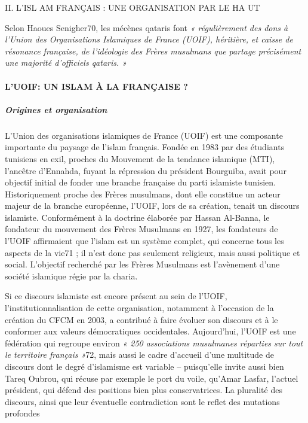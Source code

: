 II. L'ISL AM FRANÇAIS : UNE ORGANISATION PAR LE HA UT

Selon Haoues Senigher70, les mécènes qataris font \emph{« régulièrement
des dons à l'Union des Organisations Islamiques de France (UOIF),
héritière, et caisse de résonance française, de l'idéologie des Frères
musulmans que partage précisément une majorité d'officiels qataris. »}


\hypertarget{luoif-un-islam-uxe0-la-franuxe7aise}{%
\paragraph{L'UOIF: UN ISLAM À LA FRANÇAISE
?}\label{luoif-un-islam-uxe0-la-franuxe7aise}}

\hypertarget{origines-et-organisation}{%
\subparagraph{Origines et organisation}\label{origines-et-organisation}}


L'Union des organisations islamiques de France (UOIF) est une composante
importante du paysage de l'islam français. Fondée en 1983 par des
étudiants tunisiens en exil, proches du Mouvement de la tendance
islamique (MTI), l'ancêtre d'Ennahda, fuyant la répression du président
Bourguiba, avait pour objectif initial de fonder une branche française
du parti islamiste tunisien. Historiquement proche des Frères musulmans,
dont elle constitue un acteur majeur de la branche européenne, l'UOIF,
lors de sa création, tenait un discours islamiste. Conformément à la
doctrine élaborée par Hassan Al-Banna, le fondateur du mouvement des
Frères Musulmans en 1927, les fondateurs de l'UOIF affirmaient que
l'islam est un système complet, qui concerne tous les aspects de la
vie71 ; il n'est donc pas seulement religieux, mais aussi politique et
social. L'objectif recherché par les Frères Musulmans est l'avènement
d'une société islamique régie par la charia.

Si ce discours islamiste est encore présent au sein de l'UOIF,
l'institutionnalisation de cette organisation, notamment à l'occasion de
la création du CFCM en 2003, a contribué à faire évoluer son discours et
à le conformer aux valeurs démocratiques occidentales. Aujourd'hui,
l'UOIF est une fédération qui regroupe environ \emph{« 250 associations
musulmanes réparties sur tout le territoire français »}72, mais aussi le
cadre d'accueil d'une multitude de discours dont le degré d'islamisme
est variable -- puisqu'elle invite aussi bien Tareq Oubrou, qui récuse
par exemple le port du voile, qu'Amar Lasfar, l'actuel président, qui
défend des positions bien plus conservatrices. La pluralité des
discours, ainsi que leur éventuelle contradiction sont le reflet des
mutations profondes

